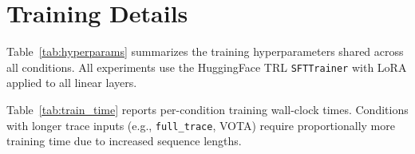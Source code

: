 \section{Training Details}
\label{sec:training_details}

Table~\ref{tab:hyperparams} summarizes the training hyperparameters shared across all conditions.
All experiments use the HuggingFace TRL \texttt{SFTTrainer} with LoRA \citep{hu2022lora} applied to all linear layers.

\begin{table}[t]
\centering
\caption{Training hyperparameters (shared across all conditions).}
\label{tab:hyperparams}
\small
{}
\end{table}

Table~\ref{tab:train_time} reports per-condition training wall-clock times.
Conditions with longer trace inputs (e.g., \texttt{full\_trace}, VOTA) require proportionally more training time due to increased sequence lengths.

